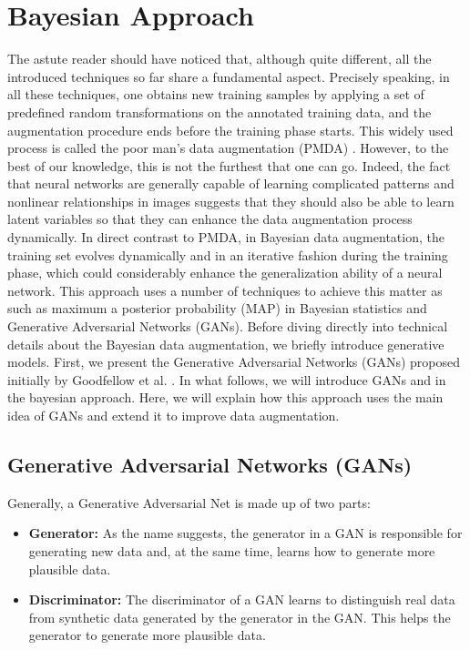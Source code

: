 \section{Bayesian Approach}
\label{tit:bayesian-approach}
The astute reader should have noticed that, although quite different, all the introduced techniques so far share a fundamental aspect. Precisely speaking, in all these techniques, one obtains new training samples by applying a set of predefined random transformations on the annotated training data, and the augmentation procedure ends before the training phase starts. This widely used process is called the poor man's data augmentation (PMDA) \cite{poor_man_data_augmentation}. However, to the best of our knowledge, this is not the furthest that one can go. Indeed, the fact that neural networks are generally capable of learning complicated patterns and nonlinear relationships in images suggests that they should also be able to learn latent variables so that they can enhance the data augmentation process dynamically.
In direct contrast to PMDA, in Bayesian data augmentation, the training set evolves dynamically and
in an iterative fashion during the training phase, which could considerably enhance the
generalization ability of a neural network. This approach uses a number of techniques to achieve this
matter as such as maximum a posterior probability (MAP) \cite{MAP_Bayesian} in Bayesian statistics and Generative
Adversarial Networks (GANs). Before diving directly into technical details about the
Bayesian data augmentation, we briefly introduce generative models. First, we
present the Generative Adversarial Networks (GANs) proposed initially by Goodfellow et al.
\cite{goodflew_bayesian_approach}. In what follows, we
will introduce GANs and in the bayesian approach. Here, we will explain how this
approach uses the main idea of GANs and extend it to improve data augmentation.

\subsection{Generative Adversarial Networks (GANs)}
\label{tit:Generative-Adversarial-Network}
Generally, a Generative Adversarial Net is made up of two parts:
\begin{itemize}
  \item{\textbf{Generator:}} As the name suggests, the generator in a GAN is responsible for generating new data and, at the same time, learns how to generate more plausible data.
  \item{\textbf{Discriminator:}} The discriminator of a GAN learns to distinguish real data from synthetic data generated
        by the generator in the GAN. This helps the generator to generate more plausible data.
\end{itemize}

